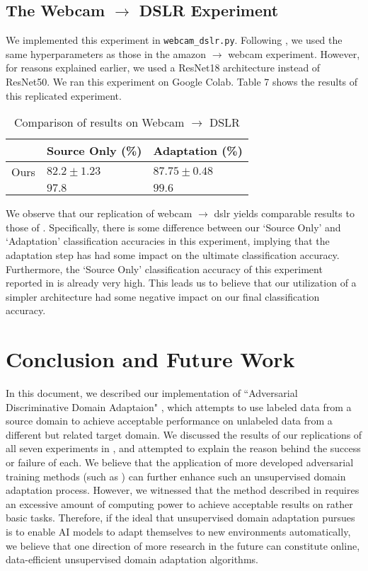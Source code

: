 \documentclass[14pt]{extarticle}
\begin{document}
		\subsection{The Webcam $\rightarrow$ DSLR Experiment}
		We implemented this experiment in \texttt{webcam\_dslr.py}. Following \cite{adda}, we used the same hyperparameters as those in the amazon $\rightarrow$ webcam experiment. However, for reasons explained earlier, we used a ResNet18 architecture instead of ResNet50. We ran this experiment on Google Colab. Table 7 shows the results of this replicated experiment.
		\begin{table}[H]
			\centering
			\begin{tabular}{|P{40mm}|P{40mm}|P{40mm}|}
				\hline
				 & Source Only (\%) & Adaptation (\%)\\
				\hline
				Ours & $82.2 \pm 1.23$ & $87.75 \pm 0.48$\\
				\hline
				\cite{adda} & $97.8$ & $99.6$\\
				\hline
			\end{tabular}
			\caption{Comparison of results on Webcam $\rightarrow$ DSLR}
		\end{table}
		We observe that our replication of webcam $\rightarrow$ dslr yields comparable results to those of \cite{adda}. Specifically, there is some difference between our `Source Only' and `Adaptation' classification accuracies in this experiment, implying that the adaptation step has had some impact on the ultimate classification accuracy. Furthermore, the `Source Only' classification accuracy of this experiment reported in \cite{adda} is already very high. This leads us to believe that our utilization of a simpler architecture had some negative impact on our final classification accuracy.
		\section{Conclusion and Future Work}
		In this document, we described our implementation of ``Adversarial Discriminative Domain Adaptaion" \cite{adda}, which attempts to use labeled data from a source domain to achieve acceptable performance on unlabeled data from a different but related target domain. We discussed the results of our replications of all seven experiments in \cite{adda}, and attempted to explain the reason behind the success or failure of each. We believe that the application of more developed adversarial training methods (such as \cite{wgan}) can further enhance such an unsupervised domain adaptation process. However, we witnessed that the method described in \cite{adda} requires an excessive amount of computing power to achieve acceptable results on rather basic tasks. Therefore, if the ideal that unsupervised domain adaptation pursues is to enable AI models to adapt themselves to new environments automatically, we believe that one direction of more research in the future can constitute online, data-efficient unsupervised domain adaptation algorithms.
	
	
\end{document}
